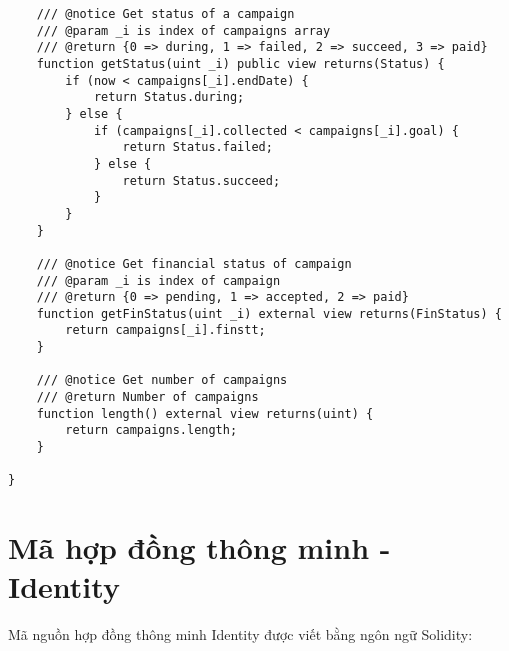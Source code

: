 \documentclass[../main-report.tex]{subfiles}
\begin{document}
\begin{lstlisting}
    /// @notice Get status of a campaign
    /// @param _i is index of campaigns array
    /// @return {0 => during, 1 => failed, 2 => succeed, 3 => paid}
    function getStatus(uint _i) public view returns(Status) {
        if (now < campaigns[_i].endDate) {
            return Status.during;
        } else {
            if (campaigns[_i].collected < campaigns[_i].goal) {
                return Status.failed;
            } else {
                return Status.succeed;
            }
        }
    }

    /// @notice Get financial status of campaign
    /// @param _i is index of campaign
    /// @return {0 => pending, 1 => accepted, 2 => paid}
    function getFinStatus(uint _i) external view returns(FinStatus) {
        return campaigns[_i].finstt;
    }

    /// @notice Get number of campaigns
    /// @return Number of campaigns
    function length() external view returns(uint) {
        return campaigns.length;
    }

}
\end{lstlisting}

\chapter{Mã hợp đồng thông minh - Identity}
Mã nguồn hợp đồng thông minh Identity được viết bằng ngôn ngữ Solidity:
\end{document}
